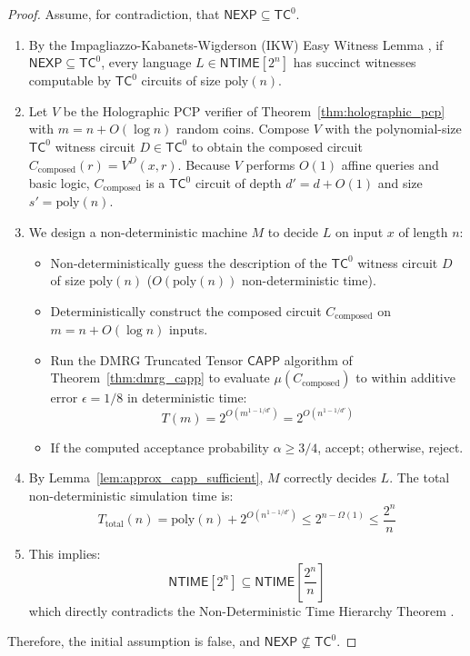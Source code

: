 \documentclass[11pt,letterpaper]{article}
\newcommand{\NEXP}{\mathsf{NEXP}}
\newcommand{\NTIME}{\mathsf{NTIME}}
\newcommand{\TC}{\mathsf{TC}}
\newcommand{\CAPP}{\mathsf{CAPP}}
\newcommand{\poly}{\mathrm{poly}}
\newcommand{\eps}{\epsilon}
\begin{document}
\begin{proof}
Assume, for contradiction, that $\NEXP \subseteq \TC^0$.
\begin{enumerate}
    \item By the Impagliazzo-Kabanets-Wigderson (IKW) Easy Witness Lemma \cite{IKW02}, if $\NEXP \subseteq \TC^0$, every language $L \in \NTIME[2^n]$ has succinct witnesses computable by $\TC^0$ circuits of size $\poly(n)$.
    \item Let $V$ be the Holographic PCP verifier of Theorem~\ref{thm:holographic_pcp} with $m = n + O(\log n)$ random coins. Compose $V$ with the polynomial-size $\TC^0$ witness circuit $D \in \TC^0$ to obtain the composed circuit $C_{\text{composed}}(r) = V^D(x, r)$. Because $V$ performs $O(1)$ affine queries and basic logic, $C_{\text{composed}}$ is a $\TC^0$ circuit of depth $d' = d + O(1)$ and size $s' = \poly(n)$.
    \item We design a non-deterministic machine $M$ to decide $L$ on input $x$ of length $n$:
    \begin{itemize}
        \item Non-deterministically guess the description of the $\TC^0$ witness circuit $D$ of size $\poly(n)$ ($O(\poly(n))$ non-deterministic time).
        \item Deterministically construct the composed circuit $C_{\text{composed}}$ on $m = n + O(\log n)$ inputs.
        \item Run the DMRG Truncated Tensor $\CAPP$ algorithm of Theorem~\ref{thm:dmrg_capp} to evaluate $\mu(C_{\text{composed}})$ to within additive error $\eps = 1/8$ in deterministic time:
        \[
        T(m) = 2^{O(m^{1 - 1/d'})} = 2^{O(n^{1 - 1/d'})}
        \]
        \item If the computed acceptance probability $\alpha \ge 3/4$, accept; otherwise, reject.
    \end{itemize}
    \item By Lemma~\ref{lem:approx_capp_sufficient}, $M$ correctly decides $L$. The total non-deterministic simulation time is:
    \[
    T_{\text{total}}(n) = \poly(n) + 2^{O(n^{1 - 1/d'})} \le 2^{n - \Omega(1)} \le \frac{2^n}{n}
    \]
    \item This implies:
    \[
    \NTIME[2^n] \subseteq \NTIME\left[ \frac{2^n}{n} \right]
    \]
    which directly contradicts the Non-Deterministic Time Hierarchy Theorem \cite{SFM78,Zak83}.
\end{enumerate}
Therefore, the initial assumption is false, and $\NEXP \not\subseteq \TC^0$.
\end{proof}
\end{document}
